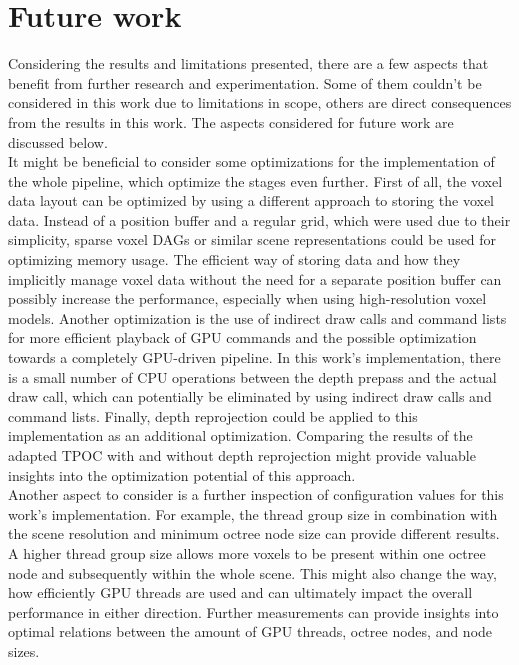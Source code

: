 \chapter{Future work} \label{cpt-future-work}

Considering the results and limitations presented, there are a few aspects that benefit from further 
research and experimentation. Some of them couldn't be considered in this work due to limitations in 
scope, others are direct consequences from the results in this work. The aspects considered for 
future work are discussed below. \\

\noindent
It might be beneficial to consider some optimizations for the implementation of the whole pipeline, which 
optimize the stages even further. First of all, the voxel data layout can be optimized by using a different
approach to storing the voxel data. Instead of a position buffer and a regular grid, which were used due to 
their simplicity, sparse voxel \ac{DAG}s or similar scene representations could be used for optimizing 
memory usage. The efficient way of storing data and how they implicitly manage voxel data without the 
need for a separate position buffer can possibly increase the performance, especially when using 
high-resolution voxel models. Another optimization is the use of indirect draw calls and command lists 
for more efficient playback of \ac{GPU} commands and the possible optimization towards a completely 
\ac{GPU}-driven pipeline. In this work's implementation, there is a small number of \ac{CPU} operations 
between the depth prepass and the actual draw call, which can potentially be eliminated by using indirect 
draw calls and command lists. Finally, depth reprojection could be applied to this implementation as an 
additional optimization. Comparing the results of the adapted \ac{TPOC} with and without depth reprojection 
might provide valuable insights into the optimization potential of this approach. \\

\noindent
Another aspect to consider is a further inspection of configuration values for this work's implementation. 
For example, the thread group size in combination with the scene resolution and minimum octree node size 
can provide different results. A higher thread group size allows more voxels to be present within one octree 
node and subsequently within the whole scene. This might also change the way, how efficiently \ac{GPU} 
threads are used and can ultimately impact the overall performance in either direction. Further measurements 
can provide insights into optimal relations between the amount of \ac{GPU} threads, octree nodes, and node 
sizes. \\

